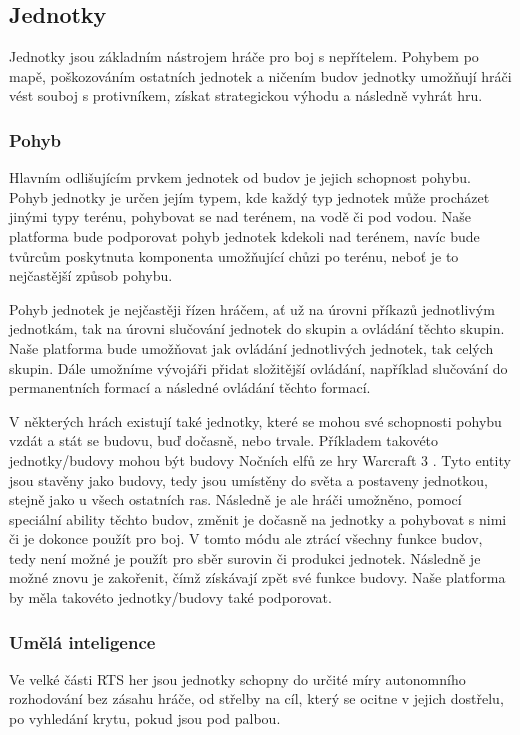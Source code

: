 \subsection{Jednotky}
\label{sec:jednotky}
Jednotky jsou základním nástrojem hráče pro boj s nepřítelem. Pohybem po mapě, poškozováním ostatních jednotek a ničením budov jednotky umožňují hráči vést souboj s protivníkem, získat strategickou výhodu a následně vyhrát hru. 

\subsubsection{Pohyb}
Hlavním odlišujícím prvkem jednotek od budov je jejich schopnost pohybu. Pohyb jednotky je určen jejím typem, kde každý typ jednotek může procházet jinými typy terénu, pohybovat se nad terénem, na vodě či pod vodou. Naše platforma bude podporovat pohyb jednotek kdekoli nad terénem, navíc bude tvůrcům poskytnuta komponenta umožňující chůzi po terénu, neboť je to nejčastější způsob pohybu. 

Pohyb jednotek je nejčastěji řízen hráčem, ať už na úrovni příkazů jednotlivým jednotkám, tak na úrovni slučování jednotek do skupin a ovládání těchto skupin. Naše platforma bude umožňovat jak ovládání jednotlivých jednotek, tak celých skupin. Dále umožníme vývojáři přidat složitější ovládání, například slučování do permanentních formací a následné ovládání těchto formací. 

V některých hrách existují také jednotky, které se mohou své schopnosti pohybu vzdát a stát se budovu, buď dočasně, nebo trvale. Příkladem takovéto jednotky/budovy mohou být budovy Nočních elfů ze hry Warcraft 3 \citep{site:warcraft3nightelfs}. Tyto entity jsou stavěny jako budovy, tedy jsou umístěny do světa a postaveny jednotkou, stejně jako u všech ostatních ras. Následně je ale hráči umožněno, pomocí speciální ability těchto budov, změnit je dočasně na jednotky a pohybovat s nimi či je dokonce použít pro boj. V tomto módu ale ztrácí všechny funkce budov, tedy není možné je použít pro sběr surovin či produkci jednotek. Následně je možné znovu je zakořenit, čímž získávají zpět své funkce budovy.  Naše platforma by měla takovéto jednotky/budovy také podporovat. 

\subsubsection{Umělá inteligence}

Ve velké části RTS her jsou jednotky schopny do určité míry autonomního rozhodování bez zásahu hráče, od střelby na cíl, který se ocitne v jejich dostřelu, po vyhledání krytu, pokud jsou pod palbou. 

